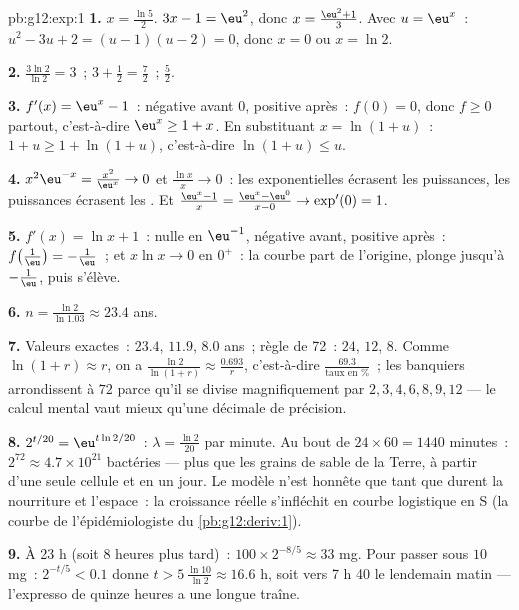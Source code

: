 \begin{solution}{pb:g12:exp:1}
\textbf{1.} $x = \frac{\ln 5}{2}$. \quad $3x - 1 = \eu^2$, donc
$x = \frac{\eu^2 + 1}{3}$. \quad Avec $u = \eu^x$~:
$u^2 - 3u + 2 = (u - 1)(u - 2) = 0$, donc $x = 0$ ou $x = \ln 2$.

\textbf{2.} $\frac{3\ln 2}{\ln 2} = 3$~; \quad
$3 + \frac12 = \frac72$~; \quad $\frac52$.

\textbf{3.} $f'(x) = \eu^x - 1$~: négative avant $0$, positive
après~:  $f(0) = 0$, donc $f \geq 0$ partout, c'est-à-dire
$\eu^x \geq 1 + x$. En substituant $x = \ln(1 + u)$~:
$1 + u \geq 1 + \ln(1 + u)$, c'est-à-dire $\ln(1 + u) \leq u$.

\textbf{4.} $x^2\eu^{-x} = \frac{x^2}{\eu^x} \to 0$ et
$\frac{\ln x}{x} \to 0$~: les exponentielles écrasent les
puissances, les puissances écrasent les . Et
$\frac{\eu^x - 1}{x} = \frac{\eu^x - \eu^0}{x - 0} \to \exp'(0) =
1$.

\textbf{5.} $f'(x) = \ln x + 1$~: nulle en $\eu^{-1}$, négative
avant, positive après~: 
$f\!\left(\frac1\eu\right) = -\frac1\eu$~; et $x \ln x \to 0$ en
$0^+$~: la courbe part de l'origine, plonge jusqu'à $-\frac1\eu$,
puis s'élève.

\textbf{6.} $n = \frac{\ln 2}{\ln 1.03} \approx 23.4$ ans.

\textbf{7.} Valeurs exactes~: $23.4$, $11.9$, $8.0$ ans~; règle de
72~: $24$, $12$, $8$. Comme $\ln(1+r) \approx r$, on a
$\frac{\ln 2}{\ln(1+r)} \approx \frac{0.693}{r}$, c'est-à-dire
$\frac{69.3}{\text{taux en }\%}$~; les banquiers arrondissent à
$72$ parce qu'il se divise magnifiquement par $2, 3, 4, 6, 8, 9,
12$ --- le calcul mental vaut mieux qu'une décimale de précision.

\textbf{8.} $2^{t/20} = \eu^{t \ln 2 / 20}$~:
$\lambda = \frac{\ln 2}{20}$ par minute. Au bout de
$24 \times 60 = 1440$ minutes~: $2^{72} \approx 4.7 \times
10^{21}$ bactéries --- plus que les grains de sable de la Terre, à
partir d'une seule cellule et en un jour. Le modèle n'est honnête
que tant que durent la nourriture et l'espace~: la croissance réelle
s'infléchit en courbe logistique en S (la courbe de
l'épidémiologiste du \cref{pb:g12:deriv:1}).

\textbf{9.} À 23 h (soit $8$ heures plus tard)~:
$100 \times 2^{-8/5} \approx 33$ mg. Pour passer sous $10$ mg~:
$2^{-t/5} < 0.1$ donne $t > 5\,\frac{\ln 10}{\ln 2} \approx
16.6$ h, soit vers 7 h 40 le lendemain matin --- l'expresso de
quinze heures a une longue traîne.


\end{solution}
